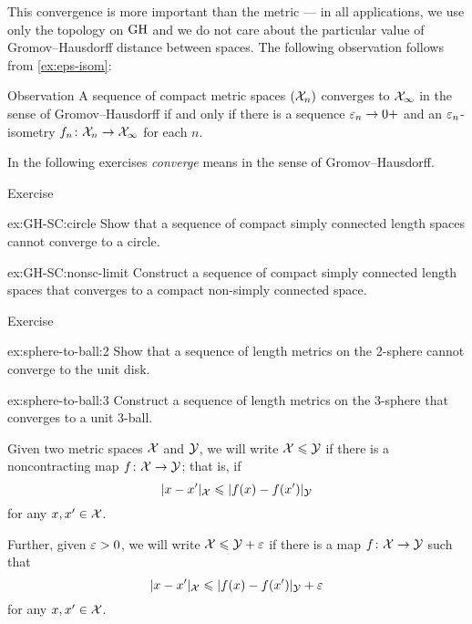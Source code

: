 This convergence is more important than the metric ---
in all applications, we use only the topology on $\operatorname{\rm GH}\nolimits$
and we do not care about the particular value of Gromov--Hausdorff distance between spaces.
The following observation follows from \ref{ex:eps-isom}:

\begin{thm}{Observation}\label{obs:GH-e-isom}
A sequence of compact metric spaces $(\mathcal{X}_n)$ converges to  $\mathcal{X}_\infty$ in the sense of Gromov--Hausdorff if and only if there is a sequence $\varepsilon_n\to0+$
and an $\varepsilon_n$-isometry $f_n\colon\mathcal{X}_n\to \mathcal{X}_\infty$ for each $n$.
\end{thm}

In the following exercises \textit{converge} means in the sense of Gromov--Hausdorff.

\begin{thm}{Exercise}\label{ex:GH-SC}
\begin{subthm}{ex:GH-SC:circle}
Show that a sequence of compact simply connected length spaces cannot converge to a circle.
\end{subthm}

\begin{subthm}{ex:GH-SC:nonsc-limit}
Construct a sequence of compact simply connected length spaces that converges to a compact non-simply connected space.
\end{subthm}
\end{thm}

\begin{thm}{Exercise}\label{ex:sphere-to-ball}
\begin{subthm}{ex:sphere-to-ball:2}
Show that a sequence of length metrics on the 2-sphere cannot converge to the unit disk.
\end{subthm}

\begin{subthm}{ex:sphere-to-ball:3}
Construct a sequence of length metrics on the 3-sphere that converges to a unit 3-ball.
\end{subthm}

\end{thm}

Given two metric spaces $\mathcal{X}$ and $\mathcal{Y}$, we will write $\mathcal{X}\leqslant \mathcal{Y}$ if there is a noncontracting map $f\colon\mathcal{X}\to \mathcal{Y}$;
that is, if 
$$ |x-x'|_{\mathcal{X}}\leqslant|f(x)-f(x')|_{\mathcal{Y}}$$
for any $x,x'\in \mathcal{X}$.

Further, given $\varepsilon>0$, we will write $\mathcal{X}\leqslant \mathcal{Y}+\varepsilon$
if there is a map $f\colon\mathcal{X}\to \mathcal{Y}$ such that 
$$|x-x'|_{\mathcal{X}}\leqslant|f(x)-f(x')|_{\mathcal{Y}}+\varepsilon$$
for any $x,x'\in \mathcal{X}$.

